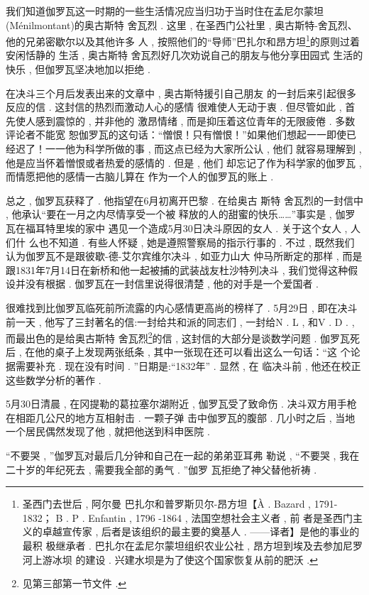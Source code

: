 我们知道伽罗瓦这一时期的一些生活情况应当归功于当时住在孟尼尔蒙坦(Ménilmontant)的奥古斯特 \textbullet 舍瓦烈 . 这里 , 在圣西门公社里 , 奥古斯特-舍瓦烈、他的兄弟密歇尔以及其他许多 人 , 按照他们的“导师”巴扎尔和昂方坦\footnote{圣西门去世后 , 阿尔曼 \textbullet 巴扎尔和普罗斯贝尔-昂方坦【À . Bazard , 1791-1832； B . P . Enfantin ,  1796 -1864 , 法国空想社会主义者 , 前 者是圣西门主义的卓越宣传家 , 后者是该组织的最主要的奠基人 . ——译者】是他的事业的最积 极继承者 . 巴扎尔在孟尼尔蒙坦组织农业公社 , 昂方坦到埃及去参加尼罗河上游冰坝 的建设 . 兴建水坝是为了使这个国家恢复从前的肥沃 . }的原则过着安闲恬静的 生活 , 奥古斯特 \textbullet 舍瓦烈好几次劝说自己的朋友与他分享田园式 生活的快乐 , 但伽罗瓦坚决地加以拒绝 . 

在决斗三个月后发表出来的文章中 , 奥古斯特援引自己朋友 的一封后来引起很多反应的信 . 这封信的热烈而激动人心的感情 很难使人无动于衷 . 但尽管如此 , 首先使人感到震惊的 , 并非他的 激昂情绪 , 而是抑压着这位青年的无限疲倦 . 多数评论者不能宽 恕伽罗瓦的这句话：“憎恨！只有憎恨！”如果他们想起一一即使已 经迟了！一一他为科学所做的事 , 而这点已经为大家所公认 , 他们 就容易理解到 , 他是应当怀着憎恨或者热爱的感情的 . 但是 , 他们 却忘记了作为科学家的伽罗瓦 , 而情愿把他的感情一古脑儿算在 作为一个人的伽罗瓦的账上 . 

总之 , 伽罗瓦获释了 . 他指望在6月初离开巴黎 . 在给奥古 斯特 \textbullet 舍瓦烈的一封信中 , 他承认“要在一月之内尽情享受一个被 释放的人的甜蜜的快乐……”事实是 , 伽罗瓦在福耳特里埃的家中 遇见一个造成5月30日决斗原因的女人 . 关于这个女人 , 人们什 么也不知道 . 有些人怀疑 , 她是遵照警察局的指示行事的 . 不过 , 既然我们认为伽罗瓦不是跟彼歇-德-艾尔宾维尔决斗 , 如亚力山大 \textbullet 仲马所断定的那样 , 而是跟1831年7月14日在新桥和他一起被捕的武装战友杜沙特列决斗 , 我们觉得这种假设并没有根据 . 伽罗瓦在一封信里说得很清楚 , 他的对手是一个爱国者 . 

很难找到比伽罗瓦临死前所流露的内心感情更高尚的榜样了 . 5月29日 , 即在决斗前一天 , 他写了三封著名的信:一封给共和派的同志们 , 一封给N . L , 和V . D .  , 而最出色的是给奥古斯特 \textbullet 舍瓦烈\footnote{见第三部第一节文件 . }的信 , 这封信的大部分是谈数学问题 . 伽罗瓦死后 , 在他的桌子上发现两张纸条 , 其中一张现在还可以看出这么一句话：“这 个论据需要补充 . 现在没有时间 . ”日期是:“1832年” . 显然 , 在 临决斗前 , 他还在校正这些数学分析的著作 . 

5月30日清晨 , 在冈提勒的葛拉塞尔湖附近 , 伽罗瓦受了致命伤 . 决斗双方用手枪在相距几公尺的地方互相射击 . 一颗子弹 击中伽罗瓦的腹部 . 几小时之后 , 当地一个居民偶然发现了他 , 就把他送到科申医院 . 

“不要哭 , ”伽罗瓦对最后几分钟和自己在一起的弟弟亚耳弗 勒说 , “不要哭 , 我在二十岁的年纪死去 , 需要我全部的勇气 . ”伽罗 瓦拒绝了神父替他祈祷 . 

